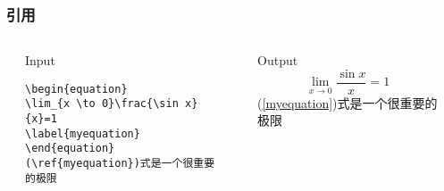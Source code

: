 \begin{frame}[fragile]\frametitle{引用}
  \begin{columns}
    \begin{column}{0.01\textwidth}
    \end{column}
    \begin{column}{0.55\textwidth}
    \begin{block}{Input}
    \begin{verbatim}
\begin{equation}
\lim_{x \to 0}\frac{\sin x}{x}=1
\label{myequation}
\end{equation}
(\ref{myequation})式是一个很重要的极限
    \end{verbatim}
    \end{block}
    \end{column}
    \begin{column}{0.025\textwidth}
    \end{column}
    \begin{column}{0.4\textwidth}
    \begin{block}{Output}
        \begin{equation}
        \lim_{x \to 0}\frac{\sin x}{x}=1
        \label{myequation}
        \end{equation}
        (\ref{myequation})式是一个很重要的极限
    \end{block}
    \end{column}
    \begin{column}{0.015\textwidth}
    \end{column}
  \end{columns}
\end{frame}
